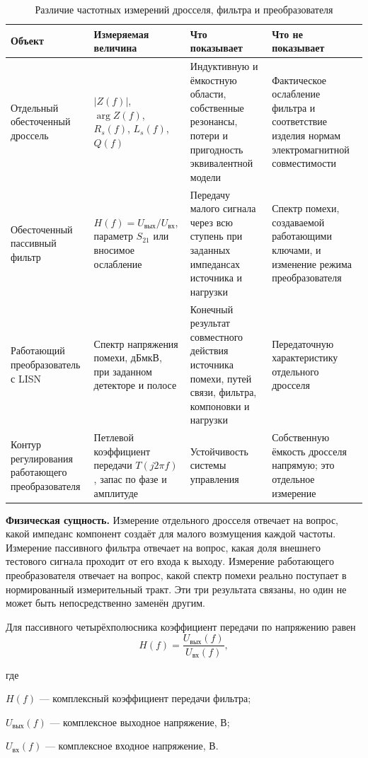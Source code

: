 \documentclass[14pt,a4paper]{extarticle}
\newcommand{\phys}{\par\noindent\textbf{Физическая сущность.} }
\newenvironment{whereblock}
 {\par\noindent где\par
  \begin{list}{}{\setlength{\leftmargin}{12.5mm}
                  \setlength{\itemindent}{-12.5mm}
                  \setlength{\itemsep}{0pt}
                  \setlength{\parsep}{0pt}
                  \setlength{\topsep}{0pt}}}
 {\end{list}}
\newcommand{\whereitem}[2]{\item[] #1 --- #2}
\begin{document}
\begin{table}[htbp]
\begin{singlespace}
\caption{Различие частотных измерений дросселя, фильтра и преобразователя}
\label{tab:frequency-measurement-types}
\centering
\small
\begin{tabularx}{\textwidth}{>{\raggedright\arraybackslash}p{30mm}
>{\raggedright\arraybackslash}p{42mm}
>{\raggedright\arraybackslash}p{44mm}
>{\raggedright\arraybackslash}X}
\toprule
Объект & Измеряемая величина & Что показывает & Что не показывает \\
\midrule
Отдельный обесточенный дроссель &
$|Z(f)|$, $\arg Z(f)$, $R_s(f)$, $L_s(f)$, $Q(f)$ &
Индуктивную и ёмкостную области, собственные резонансы, потери и пригодность
эквивалентной модели &
Фактическое ослабление фильтра и соответствие изделия нормам
электромагнитной совместимости \\
Обесточенный пассивный фильтр &
$H(f)=U_{\text{вых}}/U_{\text{вх}}$, параметр $S_{21}$ или вносимое
ослабление &
Передачу малого сигнала через всю ступень при заданных импедансах источника и
нагрузки &
Спектр помехи, создаваемой работающими ключами, и изменение режима
преобразователя \\
Работающий преобразователь с LISN &
Спектр напряжения помехи, дБмкВ, при заданном детекторе и полосе &
Конечный результат совместного действия источника помехи, путей связи,
фильтра, компоновки и нагрузки &
Передаточную характеристику отдельного дросселя \\
Контур регулирования работающего преобразователя &
Петлевой коэффициент передачи $T(j2\pi f)$, запас по фазе и амплитуде &
Устойчивость системы управления &
Собственную ёмкость дросселя напрямую; это отдельное измерение \\
\bottomrule
\end{tabularx}
\end{singlespace}
\end{table}

\phys Измерение отдельного дросселя отвечает на вопрос, какой импеданс
компонент создаёт для малого возмущения каждой частоты. Измерение пассивного
фильтра отвечает на вопрос, какая доля внешнего тестового сигнала проходит от
его входа к выходу. Измерение работающего преобразователя отвечает на вопрос,
какой спектр помехи реально поступает в нормированный измерительный тракт.
Эти три результата связаны, но один не может быть непосредственно заменён
другим.

Для пассивного четырёхполюсника коэффициент передачи по напряжению равен
\begin{equation}
 H(f)=\frac{U_{\text{вых}}(f)}{U_{\text{вх}}(f)},
 \label{eq:filter-transfer-function}
\end{equation}
\begin{whereblock}
\whereitem{$H(f)$}{комплексный коэффициент передачи фильтра;}
\whereitem{$U_{\text{вых}}(f)$}{комплексное выходное напряжение, В;}
\whereitem{$U_{\text{вх}}(f)$}{комплексное входное напряжение, В.}
\end{whereblock}
\end{document}

